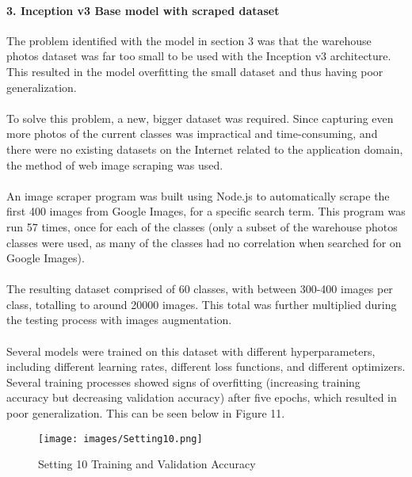 \documentclass[a4paper, 11pt]{article}
\begin{document}
        \paragraph{3. Inception v3 Base model with scraped dataset}
        The problem identified with the model in section 3 was that the warehouse photos dataset was far too small to be used with the Inception v3 architecture. This resulted in the model overfitting the small dataset and thus having poor generalization.
        \paragraph{}
        To solve this problem, a new, bigger dataset was required. Since capturing even more photos of the current classes was impractical and time-consuming, and there were no existing datasets on the Internet related to the application domain, the method of web image scraping was used.
        \paragraph{}
        An image scraper program was built using Node.js to automatically scrape the first 400 images from Google Images, for a specific search term. This program was run 57 times, once for each of the classes (only a subset of the warehouse photos classes were used, as many of the classes had no correlation when searched for on Google Images).
        \paragraph{}
        The resulting dataset comprised of 60 classes, with between 300-400 images per class, totalling to around 20000 images. This total was further multiplied during the testing process with images augmentation.
        \paragraph{}
        Several models were trained on this dataset with different hyperparameters, including different learning rates, different loss functions, and different optimizers. Several training processes showed signs of overfitting (increasing training accuracy but decreasing validation accuracy) after five epochs, which resulted in poor generalization. This can be seen below in Figure 11.\\
        \begin{figure}[H]
            \texttt{[image: images/Setting10.png]}
            \caption{Setting 10 Training and Validation Accuracy}
            \label{fig:train10}
        \end{figure}
\end{document}
